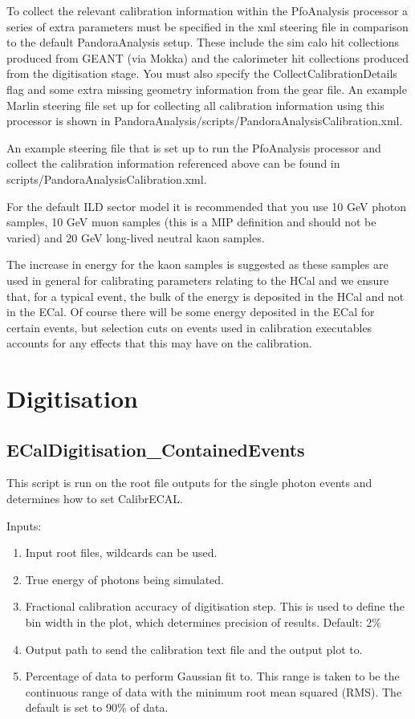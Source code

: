 \documentclass[11pt, oneside]{article}   	%
\begin{document}
To collect the relevant calibration information within the PfoAnalysis processor a series of extra parameters must be specified in the xml steering file in comparison to the default PandoraAnalysis setup.  These include the sim calo hit collections produced from GEANT (via Mokka) and the calorimeter hit collections produced from the digitisation stage.  You must also specify the CollectCalibrationDetails flag and some extra missing geometry information from the gear file.  An example Marlin steering file set up for collecting all calibration information using this processor is shown in PandoraAnalysis/scripts/PandoraAnalysisCalibration.xml.

An example steering file that is set up to run the PfoAnalysis processor and collect the calibration information referenced above can be found in scripts/PandoraAnalysisCalibration.xml.

For the default ILD sector model it is recommended that you use 10 GeV photon samples, 10 GeV muon samples (this is a MIP definition and should not be varied) and 20 GeV long-lived neutral kaon samples.

The increase in energy for the kaon samples is suggested as these samples are used in general for calibrating parameters relating to the HCal and we ensure that, for a typical event, the bulk of the energy is deposited in the HCal and not in the ECal.  Of course there will be some energy deposited in the ECal for certain events, but selection cuts on events used in calibration executables accounts for any effects that this may have on the calibration.

\section{Digitisation}

\subsection{ECalDigitisation\_ContainedEvents}

This script is run on the root file outputs for the single photon events and determines how to set CalibrECAL.

Inputs:
\begin{enumerate}
\item Input root files, wildcards can be used.
\item True energy of photons being simulated.
\item Fractional calibration accuracy of digitisation step.  This is used to define the bin width in the plot, which determines precision of results.  Default: 2\%
\item Output path to send the calibration text file and the output plot to.
\item Percentage of data to perform Gaussian fit to.  This range is taken to be the continuous range of data with the minimum root mean squared (RMS).  The default is set to 90\% of data.
\end{enumerate}
\end{document}
